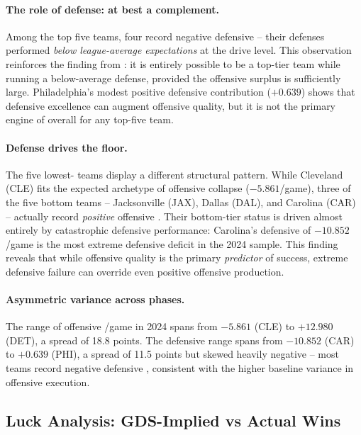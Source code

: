 \paragraph{The role of defense: at best a complement.}
Among the top five teams, four record negative defensive \xvoa{} -- their
defenses performed \emph{below league-average expectations} at the drive level.
This observation reinforces the finding from :
it is entirely possible to be a top-tier team while running a below-average
defense, provided the offensive surplus is sufficiently large. Philadelphia's
modest positive defensive contribution ($+0.639$) shows that defensive
excellence can augment offensive quality, but it is not the primary engine
of overall \gds{} for any top-five team.

\paragraph{Defense drives the floor.}
The five lowest-\gds{} teams display a different structural pattern.
While Cleveland (CLE) fits the expected archetype of offensive collapse
($-5.861$/game), three of the five bottom teams -- Jacksonville (JAX),
Dallas (DAL), and Carolina (CAR) -- actually record \emph{positive}
offensive \xvoa{}. Their bottom-tier status is driven almost entirely by
catastrophic defensive performance: Carolina's defensive \xvoa{} of
$-10.852$/game is the most extreme defensive deficit in the 2024 sample.
This finding reveals that while offensive quality is the primary
\emph{predictor} of success, extreme defensive failure can override even
positive offensive production.

\paragraph{Asymmetric variance across phases.}
The range of offensive \xvoa{}/game in 2024 spans from $-5.861$ (CLE) to
$+12.980$ (DET), a spread of 18.8 points. The defensive range spans from
$-10.852$ (CAR) to $+0.639$ (PHI), a spread of 11.5 points but skewed
heavily negative -- most teams record negative defensive \xvoa{}, consistent
with the higher baseline variance in offensive execution.

\subsection{Luck Analysis: GDS-Implied vs Actual Wins}
\label{sec:luck-analysis}

